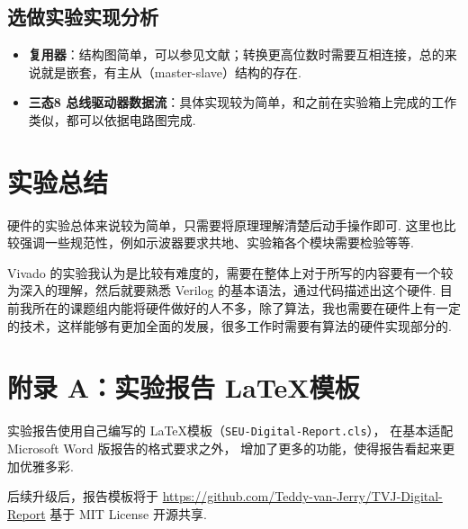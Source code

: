 \documentclass[11pt]{SEU-Digital-Report}
\begin{document}
            \newpage
            \subsection{选做实验实现分析}

            \begin{itemize}
                \item \textbf{复用器}：结构图简单，可以参见文献\cite{guide}；转换更高位数时需要互相连接，总的来说就是嵌套，有主从（master-slave）结构的存在.
                \item \textbf{三态8 总线驱动器数据流}：具体实现较为简单，和之前在实验箱上完成的工作类似，都可以依据电路图完成.
            \end{itemize}

        \section{实验总结}

            硬件的实验总体来说较为简单，只需要将原理理解清楚后动手操作即可.
            这里也比较强调一些规范性，例如示波器要求共地、实验箱各个模块需要检验等等.

            Vivado 的实验我认为是比较有难度的，需要在整体上对于所写的内容要有一个较为深入的理解，然后就要熟悉 Verilog 的基本语法，通过代码描述出这个硬件.
            目前我所在的课题组内能将硬件做好的人不多，除了算法，我也需要在硬件上有一定的技术，这样能够有更加全面的发展，很多工作时需要有算法的硬件实现部分的.


    \printbibliography[sorting=none]

    \newpage
    \section*{附录 A：实验报告 \LaTeX 模板}

        实验报告使用自己编写的 \LaTeX 模板（\texttt{SEU-Digital-Report.cls}），
        在基本适配 Microsoft Word 版报告的格式要求之外，
        增加了更多的功能，使得报告看起来更加优雅多彩.

        后续升级后，报告模板将于 \url{https://github.com/Teddy-van-Jerry/TVJ-Digital-Report} 基于 MIT License 开源共享.
\end{document}
